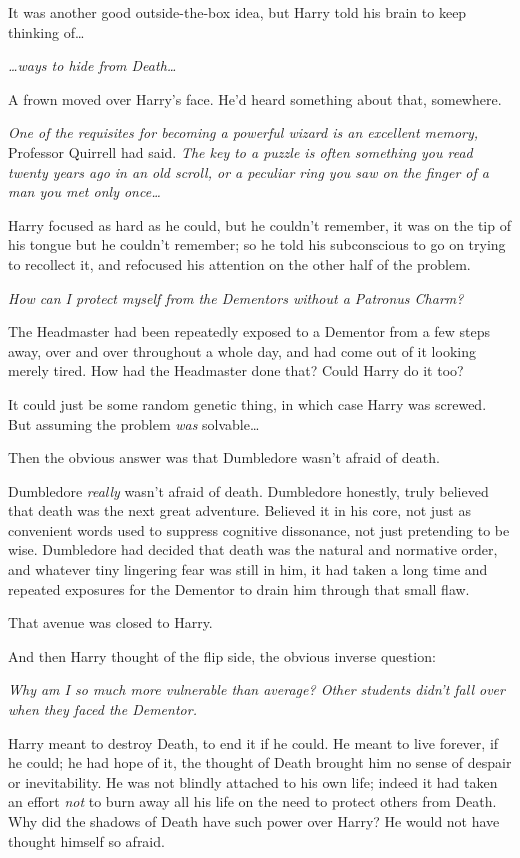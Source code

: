 It was another good outside-the-box idea, but Harry told his brain to keep thinking of{\ldots}

\emph{{\ldots}ways to hide from Death{\ldots}}

A frown moved over Harry's face. He'd heard something about that, somewhere.

\emph{One of the requisites for becoming a powerful wizard is an excellent memory,} Professor Quirrell had said. \emph{The key to a puzzle is often something you read twenty years ago in an old scroll, or a peculiar ring you saw on the finger of a man you met only once{\ldots}}

Harry focused as hard as he could, but he couldn't remember, it was on the tip of his tongue but he couldn't remember; so he told his subconscious to go on trying to recollect it, and refocused his attention on the other half of the problem.

\emph{How can I protect myself from the Dementors without a Patronus Charm?}

The Headmaster had been repeatedly exposed to a Dementor from a few steps away, over and over throughout a whole day, and had come out of it looking merely tired. How had the Headmaster done that? Could Harry do it too?

It could just be some random genetic thing, in which case Harry was screwed. But assuming the problem \emph{was} solvable{\ldots}

Then the obvious answer was that Dumbledore wasn't afraid of death.

Dumbledore \emph{really} wasn't afraid of death. Dumbledore honestly, truly believed that death was the next great adventure. Believed it in his core, not just as convenient words used to suppress cognitive dissonance, not just pretending to be wise. Dumbledore had decided that death was the natural and normative order, and whatever tiny lingering fear was still in him, it had taken a long time and repeated exposures for the Dementor to drain him through that small flaw.

That avenue was closed to Harry.

And then Harry thought of the flip side, the obvious inverse question:

\emph{Why am I so much more vulnerable than average? Other students didn't fall over when they faced the Dementor.}

Harry meant to destroy Death, to end it if he could. He meant to live forever, if he could; he had hope of it, the thought of Death brought him no sense of despair or inevitability. He was not blindly attached to his own life; indeed it had taken an effort \emph{not} to burn away all his life on the need to protect others from Death. Why did the shadows of Death have such power over Harry? He would not have thought himself so afraid.

